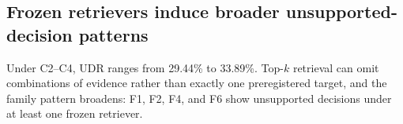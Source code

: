 \subsection{Frozen retrievers induce broader unsupported-decision patterns}

\begin{table}[t]
\centering
\small
{}
\caption{Aggregate P2 results, in percent. C1 required-fact recall is a mean over all
required facts; complete coverage is 0/180.}
\label{tab:aggregate}
\end{table}

Under C2--C4, UDR ranges from 29.44\% to 33.89\%. Top-$k$ retrieval can omit combinations
of evidence rather than exactly one preregistered target, and the family pattern broadens:
F1, F2, F4, and F6 show unsupported decisions under at least one frozen retriever.

\begin{table}[t]
\centering
\small
{}
\caption{Family-level UDR (\%) for the retrieval conditions. Silentness is a property of
the resulting evidence surface relative to the policy, not a synonym for the F6 label.}
\label{tab:family-retrieval}
\end{table}

